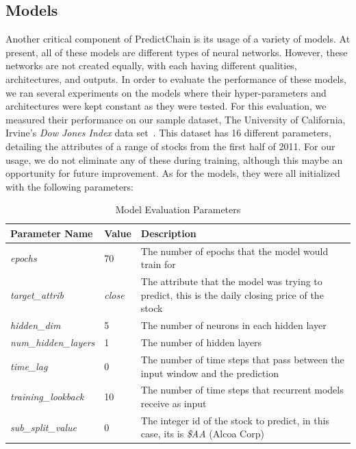 \documentclass{ledger}
\begin{document}
\subsection{Models}

Another critical component of PredictChain is its usage of a variety of models.  At present, all of these models are
different types of neural networks.  However, these networks are not created equally, with each having different qualities,
architectures, and outputs.  In order to evaluate the performance of these models, we ran several experiments on the
models where their hyper-parameters and architectures were kept constant as they were tested.  For this evaluation, we
measured their performance on our sample dataset, The University of California, Irvine's \textit{Dow Jones Index} data
set~\cite{dowJones}.  This dataset has 16 different parameters, detailing the attributes of a range of stocks from the
first half of 2011.  For our usage, we do not eliminate any of these during training, although this maybe an opportunity
for future improvement.  As for the models, they were all initialized with the following parameters:

\begin{table}[H]
    \begin{center}
        \caption{{Model Evaluation Parameters}}
        \label{tab:evalParams}
        \bgroup
        \def\arraystretch{1.2}
        \begin{tabular}{|p{4cm}|p{1cm}|p{8cm}|}
            \hline
            \textbf{Parameter Name} & \textbf{Value} & \textbf{Description}\\
            \hline
            \textit{epochs} & 70 & The number of epochs that the model would train for\\
            \hline
            \textit{target\_attrib} & \textit{close} & The attribute that the model was trying to predict, this is the daily closing price of the stock\\
            \hline
            \textit{hidden\_dim} & 5 & The number of neurons in each hidden layer\\
            \hline
            \textit{num\_hidden\_layers} & 1 & The number of hidden layers\\
            \hline
            \textit{time\_lag} & 0 & The number of time steps that pass between the input window and the prediction\\
            \hline
            \textit{training\_lookback} & 10 & The number of time steps that recurrent models receive as input\\
            \hline
            \textit{sub\_split\_value} & 0 & The integer id of the stock to predict, in this case, its is \textit{\$AA} (Alcoa Corp)\\
            \hline
        \end{tabular}
        \egroup
    \end{center}
\end{table}
\end{document}
